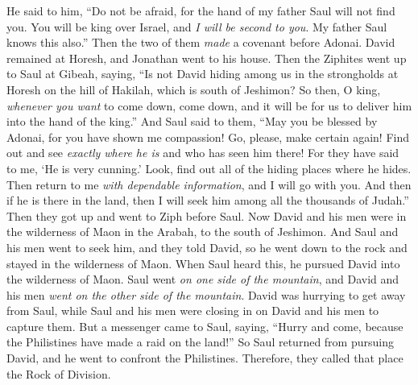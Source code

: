 \begin{biblechapter}
\verse He said to him, “Do not be afraid, for the hand of my father Saul will not find you. You will be king over Israel, and \textit{I will be second to you}. My father Saul knows this also.”
\verse Then the two of them \textit{made} a covenant before Adonai. David remained at Horesh, and Jonathan went to his house.
\verse Then the Ziphites went up to Saul at Gibeah, saying, “Is not David hiding among us in the strongholds at Horesh on the hill of Hakilah, which is south of Jeshimon?
\verse So then, O king, \textit{whenever you want} to come down, come down, and it will be for us to deliver him into the hand of the king.”
\verse And Saul said to them, “May you be blessed by Adonai, for you have shown me compassion!
\verse Go, please, make certain again! Find out and see \textit{exactly where he is} and who has seen him there! For they have said to me, ‘He is very cunning.’
\verse Look, find out all of the hiding places where he hides. Then return to me \textit{with dependable information}, and I will go with you. And then if he is there in the land, then I will seek him among all the thousands of Judah.”
\verse Then they got up and went to Ziph before Saul.
\verse Now David and his men were in the wilderness of Maon in the Arabah, to the south of Jeshimon.
\verse And Saul and his men went to seek him, and they told David, so he went down to the rock and stayed in the wilderness of Maon. When Saul heard this, he pursued David into the wilderness of Maon.
\verse Saul went \textit{on one side of the mountain}, and David and his men \textit{went on the other side of the mountain}. David was hurrying to get away from Saul, while Saul and his men were closing in on David and his men to capture them.
\verse But a messenger came to Saul, saying, “Hurry and come, because the Philistines have made a raid on the land!”
\verse So Saul returned from pursuing David, and he went to confront the Philistines. Therefore, they called that place the Rock of Division.
\end{biblechapter}

